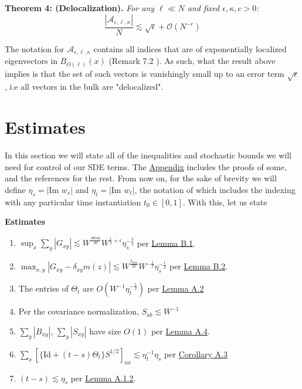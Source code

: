 \documentclass[11pt]{article}
\newenvironment{boxtheorem}[1]
  {\begin{mdframed}\noindent\textbf{#1}\itshape\space}
  {\end{mdframed}}
\newenvironment{boxt}[1]
  {\begin{mdframed}\noindent\textbf{#1}\normalfont\space}
  {\end{mdframed}}
\newcommand{\sto}{\text{stop}}
\newcommand{\im}{\text{Im }}
\begin{document}
\begin{boxtheorem}{Theorem 4: (Delocalization).}
For any $\ell\ll N$ and fixed $\epsilon, \kappa, c>0$: $$\frac{|\mathcal{A}_{\epsilon, \ell, \kappa}|}{N}\lesssim \sqrt{\epsilon}+\mathcal{O}(N^{-c})$$
\end{boxtheorem}
The notation for $\mathcal{A}_{\epsilon, \ell, \kappa}$ contains all indices that are of exponentially localized eigenvectors in $B_{O(\ell)}(x)$ (Remark 7.2 \cite{21}). As such, what the result above implies is that the set of such vectors is vanishingly small up to an error term $\sqrt \epsilon$, i.e all vectors in the bulk are "delocalized". 



\newpage
\section{Estimates }
\label{sec:estimates}

In this section we will state all of the inequalities and stochastic bounds we will need for control of our SDE terms. The \hyperref[sec:appendix]{Appendix} includes the proofs of some, and the references for the rest. From now on, for the sake of brevity we will define $\eta_s = |\im w_s|$ and $\eta_t = |\im w_t|$, the notation of which includes the indexing with any particular time instantiation $t_0\in [0, 1]$. With this, let us state

\begin{boxt}{Estimates}

\begin{enumerate}[label=(E\arabic*)]

\item  $\sup_x\sum_{y}|G_{xy}|\lesssim W^{\frac{\delta\sto}{20}} W^{\frac{1}{2}+\epsilon}\eta_{s}^{-\frac{3}{4}}$ per \hyperref[lemma-b1]{Lemma B.1}.

\item $\max_{x,y}\left\vert G_{xy} - \delta_{xy}m(z)\right\vert\lesssim W^{\frac{\delta_\sto}{20}}W^{-\frac{1}{2}}\eta_s^{-\frac{1}{4}}$ per  \hyperref[lemma-b2]{Lemma B.2}. 


\item  The entries of $\Theta_{t}$ are  $O\left(W^{-1}\eta_{t}^{-\frac{1}{2}}\right)$ per \hyperref[lemma-a2]{Lemma A.2}
    
\item Per the covariance normalization, $S_{ab}\lesssim W^{-1}$
\item $\sum_{y}|B_{xy}|$, $\sum_{y}|S_{xy}|$ have size $O(1)$ per \hyperref[lemma-a4]{Lemma A.4}.

\item $\sum_{x}\left[\{\text{Id} + (t-s)\Theta_t\}S^{1/2}\right]_{ax}\lesssim \eta_t^{-1}\eta_s$ per \hyperref[cor-a3]{Corollary A.3}

\item $(t-s)\lesssim \eta_s$ per \hyperref[lemma-a12]{Lemma A.1.2}. 
\end{enumerate}
\end{boxt}
\end{document}
